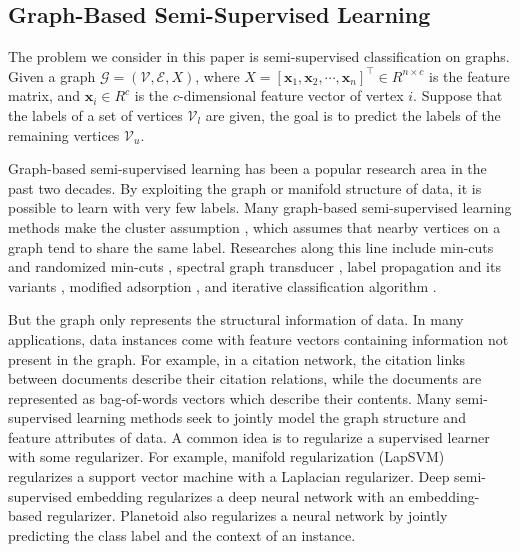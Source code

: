 \documentclass[letterpaper]{article} \usepackage{aaai18}  \usepackage{times}  \usepackage{helvet}  \usepackage{courier}  \usepackage{url}  \usepackage{graphicx}  \usepackage{algorithm}
\begin{document}
\subsection{Graph-Based Semi-Supervised Learning}

The problem we consider in this paper is semi-supervised classification on graphs. Given a graph $\mathcal{G}=(\mathcal{V},\mathcal{E}, X)$, where $X=[\mathbf{x}_1,\mathbf{x}_2,\cdots,\mathbf{x}_n]^\top \in R^{n\times c}$ is the feature matrix, and $\mathbf{x}_i \in R^{c}$ is the $c$-dimensional feature vector of vertex $i$. Suppose that the labels of a set of vertices $\mathcal{V}_l$ are given, the goal is to predict the labels of the remaining vertices $\mathcal{V}_u$.


Graph-based semi-supervised learning has been a popular research area in the past two decades. By exploiting the graph or manifold structure of data, it is possible to learn with very few labels. Many graph-based semi-supervised learning methods make the cluster assumption \cite{chapelle2005semi}, which assumes that nearby vertices on a graph tend to share the same label. Researches along this line include min-cuts \cite{blum2001learning} and randomized min-cuts \cite{blum2004semi}, spectral graph transducer \cite{joachims2003transductive}, label propagation \cite{Zhu03} and its variants \cite{Zhou03,bengio2006label}, modified adsorption \cite{talukdar2009new}, and iterative classification algorithm \cite{sen2008collective}.





But the graph only represents the structural information of data. In many applications, data instances come with feature vectors containing information not present in the graph. For example, in a citation network, the citation links between documents describe their citation relations, while the documents are represented as bag-of-words vectors which describe their contents. Many semi-supervised learning methods seek to jointly model the graph structure and feature attributes of data. A common idea is to regularize a supervised learner with some regularizer. For example, manifold regularization (LapSVM) \cite{belkin2006manifold} regularizes a support vector machine with a Laplacian regularizer. Deep semi-supervised embedding \cite{weston2012deep} regularizes a deep neural network with an embedding-based regularizer. Planetoid \cite{yang2016revisiting} also regularizes a neural network by jointly predicting the class label and the context of an instance.
\end{document}
